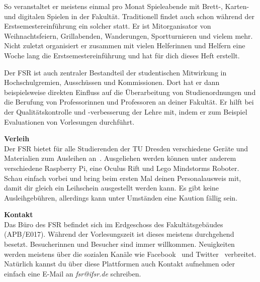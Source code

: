 So veranstaltet er meistens einmal pro Monat Spieleabende mit Brett-, Karten- und digitalen Spielen in der Fakultät. Traditionell findet auch schon während der Erstsemestereinführung ein solcher statt.
Er ist Mitorganisator von Weihnachtsfeiern, Grillabenden, Wanderungen, Sportturnieren und vielem mehr.
Nicht zuletzt organisiert er zusammen mit vielen Helferinnen und Helfern eine Woche lang die Erstsemestereinführung und hat für dich dieses Heft erstellt.

Der FSR ist auch zentraler Bestandteil der studentischen Mitwirkung in Hochschulgremien, Ausschüssen und Kommissionen.
Dort hat er dann beispielsweise direkten Einfluss auf die Überarbeitung von Studienordnungen und die Berufung von Professorinnen und Professoren an deiner Fakultät.
Er hilft bei der Qualitätskontrolle und -verbesserung der Lehre mit, indem er zum Beispiel Evaluationen von Vorlesungen durchführt.

\textbf{Verleih} \\
Der FSR bietet für alle Studierenden der TU Dresden verschiedene Geräte und Materialien zum Ausleihen an~.
Ausgeliehen werden können unter anderem verschiedene Raspberry Pi, eine Oculus Rift und Lego Mindstorms Roboter.
Schau einfach vorbei und bring beim ersten Mal deinen Personalausweis mit, damit dir gleich ein Leihschein ausgestellt werden kann.
Es gibt keine Ausleihgebühren, allerdings kann unter Umständen eine Kaution fällig sein.

\textbf{Kontakt} \\
Das Büro des FSR befindet sich im Erdgeschoss des Fakultätsgebäudes (APB/E017). Während der Vorlesungszeit ist dieses meistens durchgehend besetzt. Besucherinnen und Besucher sind immer willkommen. Neuigkeiten werden meistens über die sozialen Kanäle wie Facebook~ und Twitter~ verbreitet. Natürlich kannst du über diese Plattformen auch Kontakt aufnehmen oder einfach eine E-Mail an \textit{fsr@ifsr.de} schreiben.

